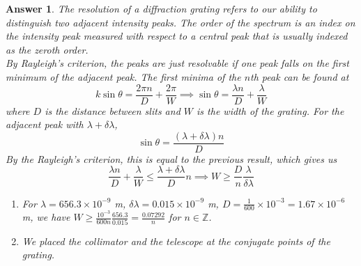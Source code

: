 \documentclass[a4paper]{article}
\newtheorem{ans}{Answer}[section]
\theoremstyle{new}
\begin{document}
\begin{ans}
The resolution of a diffraction grating refers to our ability to distinguish two adjacent intensity peaks. The order of the spectrum is an index on the intensity peak measured with respect to a central peak that is usually indexed as the zeroth order.\\[5pt]
By Rayleigh's criterion, the peaks are just resolvable if one peak falls on the first minimum of the adjacent peak. The first minima of the $n$th peak can be found at
$$k\sin\theta=\frac{2\pi n}{D}+\frac{2\pi}{W}\implies\sin\theta=\frac{\lambda n}{D}+\frac{\lambda}{W}$$
where $D$ is the distance between slits and $W$ is the width of the grating. For the adjacent peak with $\lambda+\delta\lambda$,
$$\sin\theta=\frac{(\lambda+\delta\lambda)n}{D}$$
By the Rayleigh's criterion, this is equal to the previous result, which gives us
$$\frac{\lambda n}{D}+\frac{\lambda}{ W}\leq\frac{\lambda+\delta\lambda}{D}n\implies W\geq\frac{D}{n}\frac{\lambda}{\delta\lambda}$$
\begin{enumerate}[label=(\alph*)]
\item For $\lambda=656.3\times10^{-9}$ m, $\delta\lambda=0.015\times10^{-9}$ m, $D=\frac{1}{600}\times10^{-3}=1.67\times10^{-6}$ m, we have $W\geq\frac{10^{-3}}{600n}\frac{656.3}{0.015}=\frac{0.07292}{n}$ for $n\in\mathbb{Z}$.
\item We placed the collimator and the telescope at the conjugate points of the grating.
\end{enumerate}
\end{ans}
\end{document}
